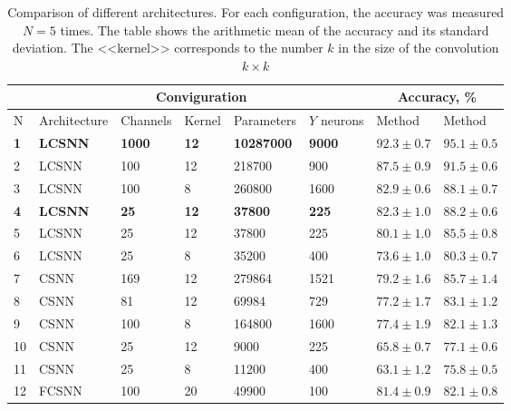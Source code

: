 \documentclass[a4paper,10pt]{article}
\begin{document}
\begin{table}
 \caption{Comparison of different architectures. For each configuration, the accuracy was measured $ N = 5 $ times. The table shows the arithmetic mean of the accuracy and its standard deviation. The <<kernel>> corresponds to the number $ k $ in the size of the convolution $ k \times k $}
\begin{center}
\begin{tabular}{|l|l|l|l|l|l|p{2.2cm}|p{2.2cm}|}
\hline
&\multicolumn{5}{c|}{Conviguration} & \multicolumn{2}{c|}{Accuracy, \%}\\
\hline
N & Architecture & Channels & Kernel & Parameters & $Y$ neurons & {Method \footnotemark[1]} & {Method \footnotemark[2]} \\
\hline\hline
{\textbf{1}} & {\textbf{LCSNN}} & {\textbf{1000}} & {\textbf{12}} & {\textbf{10287000}} & {\textbf{9000}} & {$\mathbf{92.3 \pm 0.7}$} & {$\mathbf{95.1 \pm 0.5}$}\\
\hline
2 & {LCSNN} & {100} & {12} & {218700} & {900} & {$87.5 \pm 0.9$} & {$91.5 \pm 0.6$}\\
\hline
3 & {LCSNN} & {100} & {8} & {260800} & {1600} & {$82.9 \pm 0.6$} & {$88.1 \pm 0.7$}\\
\hline
{\textbf{4}} & {\textbf{LCSNN\footnotemark[3]}} & {\textbf{25}} & {\textbf{12}} & {\textbf{37800}} & {\textbf{225}} & {$\mathbf{82.3 \pm 1.0}$} & {$\mathbf{88.2 \pm 0.6}$}\\
\hline
5 & {LCSNN} & {25} & {12} & {37800} & {225} & {$80.1 \pm 1.0$} & {$85.5 \pm 0.8$}\\
\hline
6 & {LCSNN} & {25} & {8} & {35200} & {400} & {$73.6 \pm 1.0$} & {$80.3 \pm 0.7$}\\
\hline\hline
7 & {CSNN} & {169} & {12} & {279864} & {1521} & {$79.2 \pm 1.6$} & {$85.7 \pm 1.4$}\\
\hline
8 & {CSNN} & {81} & {12} & {69984} & {729} & {$77.2 \pm 1.7$} & {$83.1 \pm 1.2$}\\
\hline
9 & {CSNN} & {100} & {8} & {164800} & {1600} & {$77.4 \pm 1.9$} & {$82.1 \pm 1.3$}\\
\hline
10 & {CSNN} & {25} & {12} & {9000} & {225} & {$65.8 \pm 0.7$} & {$77.1 \pm 0.6$}\\
\hline
11 & {CSNN} & {25} & {8} & {11200} & {400} & {$63.1 \pm 1.2$} & {$75.8 \pm 0.5$}\\
\hline\hline
12 & {FCSNN} & {100} & {20} & {49900} & {100} & {$81.4 \pm 0.9$} & {$82.1 \pm 0.8$}\\
\hline
\end{tabular}
\end{center}
 \label{results}
\end{table}
\end{document}
